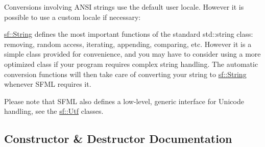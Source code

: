 \begin{DoxyCode}{0}
\DoxyCodeLine{}
\end{DoxyCode}


Conversions involving A\+N\+SI strings use the default user locale. However it is possible to use a custom locale if necessary\+: 
\begin{DoxyCode}{0}
\end{DoxyCode}


\mbox{\hyperlink{classsf_1_1_string}{sf\+::\+String}} defines the most important functions of the standard std\+::string class\+: removing, random access, iterating, appending, comparing, etc. However it is a simple class provided for convenience, and you may have to consider using a more optimized class if your program requires complex string handling. The automatic conversion functions will then take care of converting your string to \mbox{\hyperlink{classsf_1_1_string}{sf\+::\+String}} whenever S\+F\+ML requires it.

Please note that S\+F\+ML also defines a low-\/level, generic interface for Unicode handling, see the \mbox{\hyperlink{classsf_1_1_utf}{sf\+::\+Utf}} classes. \begin{DoxyVerb}\end{DoxyVerb}
 

\subsection{Constructor \& Destructor Documentation}
\mbox{\label{classsf_1_1_string_a9563a4e93f692e0c8e8702b374ef8692}} 
